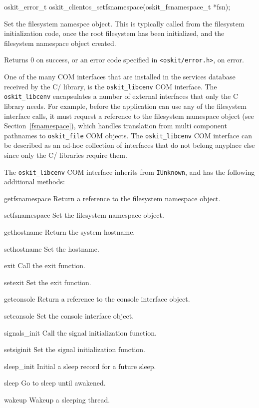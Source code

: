 \label{oskit-clientos-setfsnamespace}
\begin{apisyn}

	\funcproto oskit_error_t
		   oskit_clientos_setfsnamespace(oskit_fsnamespace_t *fsn);
\end{apisyn}
\begin{apidesc}
	Set the filesystem namespce object. This is typically called from
	the filesystem initialization code, once the root filesystem has
	been initialized, and the filesystem namespace object created.
\end{apidesc}
\begin{apiret}
	Returns 0 on success, or an error code specified in
	{\tt <oskit/error.h>}, on error.
\end{apiret}


One of the many COM interfaces that are installed in the services database
received by the C/\posix{} library, is the \texttt{oskit_libcenv} COM
interface.  The \texttt{oskit_libcenv} encapsulates a number of external
interfaces that only the C library needs. For example, before the
application can use any of the filesystem interface calls, it must request
a reference to the filesystem namespace object (see Section~\ref{fsnamespace}),
which handles translation from multi component
pathnames to \texttt{oskit_file} COM objects. The \texttt{oskit_libcenv}
COM interface can be described as an ad-hoc collection of interfaces that
do not belong anyplace else since only the C/\posix{} libraries require
them.

The {\tt oskit_libcenv} COM interface inherits from {\tt IUnknown}, and has
the following additional methods:
\begin{icsymlist}
\item[getfsnamespace]
	Return a reference to the filesystem namespace object.
\item[setfsnamespace]
	Set the filesystem namespace object.
\item[gethostname]
	Return the system hostname.
\item[sethostname]
	Set the hostname.
\item[exit]
	Call the exit function.
\item[setexit]
	Set the exit function.
\item[getconsole]
	Return a reference to the console interface object.
\item[setconsole]
	Set the console interface object.
\item[signals_init]
	Call the signal initialization function.
\item[setsiginit]
	Set the signal initialization function.
\item[sleep_init]
	Initial a sleep record for a future sleep.
\item[sleep]
	Go to sleep until awakened.
\item[wakeup]
	Wakeup a sleeping thread.
\end{icsymlist}

